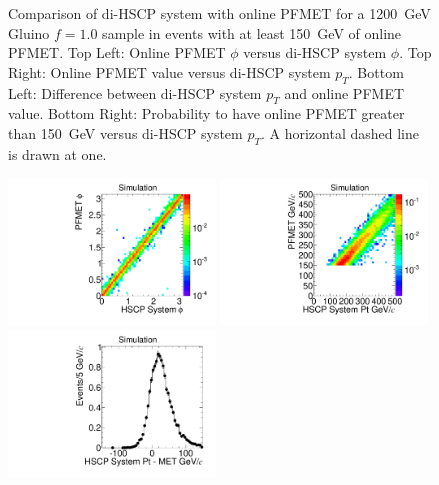 \begin{figure}
\begin{center}
      \caption[Comparison of di-HSCP system $\phi$ and \pt\ with online PFMET for a 1200~GeV 
Gluino $f=1.0$ sample in events with at least 150~GeV of online PFMET.]
        {Comparison of di-HSCP system with online PFMET for a 1200~GeV Gluino $f=1.0$ sample in events with at least 150~GeV of online PFMET. 
         Top Left: Online PFMET $\phi$ versus di-HSCP system $\phi.$ Top Right: Online PFMET value versus di-HSCP system $p_T$. 
         Bottom Left: Difference between di-HSCP system $p_T$ and online PFMET value.
         Bottom Right: Probability to have online PFMET greater than 150~GeV versus di-HSCP system $p_T$. A horizontal dashed line is drawn at one.
        }
      \label{fig:SystPtTrigger}
  \end{center}
\end{figure}

\begin{figure}
  \begin{center}
      \includegraphics[clip=true, trim=0.0cm 0cm 3.0cm 0cm, width=0.49\textwidth]{figures/search/Gluino_8TeV_M1200N_f10SystPhiMET}
      \includegraphics[clip=true, trim=0.0cm 0cm 3.0cm 0cm, width=0.49\textwidth]{figures/search/Gluino_8TeV_M1200N_f10SystPtMET} \\
      \includegraphics[clip=true, trim=0.0cm 0cm 3.0cm 0cm, width=0.49\textwidth]{figures/search/Gluino_8TeV_M1200N_f10SystPtDiffMET}

\end{center}
\end{figure}
